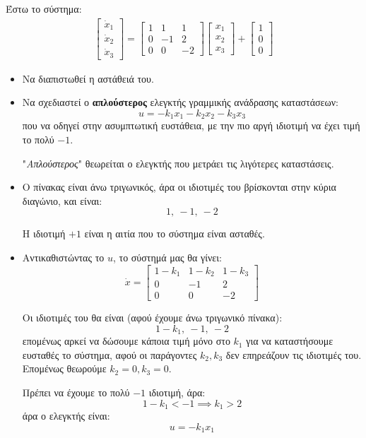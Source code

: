 \documentclass[11pt,a4paper,notitlepage,fleqn]{article}
\begin{document}
\begin{exercise}
	Έστω το σύστημα:
	\begin{align*}
		\left[\begin{matrix}
		\dot x_1 \\ \dot x_2 \\ \dot x_3
		\end{matrix}\right] = \left[\begin{matrix}
		1 & 1 & 1 \\ 0 & -1 & 2 \\
		0 & 0 & -2
		\end{matrix}\right]\left[\begin{matrix}
		x_1 \\ x_2 \\ x_3
		\end{matrix}\right] + \left[\begin{matrix}
		1 \\ 0 \\ 0
		\end{matrix}\right]
	\end{align*}
	
	\begin{itemize}
		\item Να διαπιστωθεί η αστάθειά του.
		\item Να σχεδιαστεί ο \textbf{απλούστερος} ελεγκτής γραμμικής ανάδρασης καταστάσεων:
		\[
		u = -k_1 x_1 - k_2x_2 -k_3x_3
		\]
	    που να οδηγεί στην ασυμπτωτική ευστάθεια, με την πιο αργή ιδιοτιμή
	    να έχει τιμή το πολύ \( -1 \).
	    
	    "\textit{Απλούστερος}" θεωρείται ο ελεγκτής που μετράει τις λιγότερες
	    καταστάσεις.
	\end{itemize}
    \tcblower
    \begin{itemize}
    	\item Ο πίνακας είναι άνω τριγωνικός, άρα οι ιδιοτιμές του βρίσκονται στην κύρια διαγώνιο, και είναι:
    	\[
    	1,\ -1,\ -2
    	\]
    	
    	Η ιδιοτιμή \( +1 \) είναι η αιτία που το σύστημα είναι ασταθές.
    	\item Αντικαθιστώντας το \( u \), το σύστημά μας θα γίνει:
    	\[
    	\dot x = \left[\begin{matrix}
    	1-k_1 & 1-k_2 & 1-k_3 \\
    	0 & -1 & 2 \\
    	0 & 0 & -2
    	\end{matrix}\right]
    	\]
    	
    	Οι ιδιοτιμές του θα είναι (αφού έχουμε άνω τριγωνικό πίνακα):
    	\[
    	1-k_1, \ -1,\ -2
    	\]
    	επομένως αρκεί να δώσουμε κάποια τιμή μόνο στο \( k_1 \) για να
    	καταστήσουμε ευσταθές το σύστημα, αφού οι παράγοντες \( k_2,k_3 \)
    	δεν επηρεάζουν τις ιδιοτιμές του. Επομένως θεωρούμε \( k_2 = 0, k_3 = 0 \).
    	
    	Πρέπει να έχουμε το πολύ \( -1 \) ιδιοτιμή, άρα:
    	\[
    	1-k_1 < -1 \implies \boxed{k_1 > 2}
    	\]
    	άρα ο ελεγκτής είναι:
    	\[
    	u = -k_1x_1
    	\]
    \end{itemize}
\end{exercise}
\end{document}
